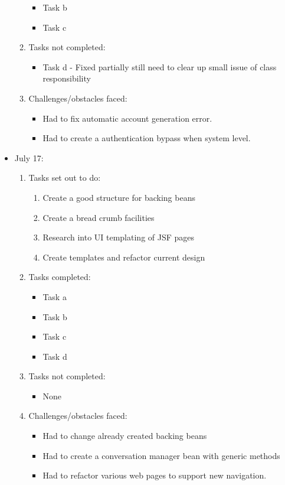 \begin{itemize}
\begin{enumerate}
\begin{itemize}
			\item Task b
			\item Task c								
		\end{itemize}
		\item Tasks not completed:
		\begin{itemize}
			\item Task d - Fixed partially still need to clear up small issue of class responsibility
		\end{itemize}
		\item Challenges/obstacles faced:
		\begin{itemize}
			\item Had to fix automatic account generation error.
			\item Had to create a authentication bypass when system level.
		\end{itemize}			
	\end{enumerate}
	\item July 17:
	\begin{enumerate}
		\item Tasks set out to do:
		\begin{enumerate}
			\item Create a good structure for backing beans
			\item Create a bread crumb facilities
			\item Research into UI templating of JSF pages
			\item Create templates and refactor current design			
		\end{enumerate}
		\item Tasks completed:
		\begin{itemize}
			\item Task a
			\item Task b
			\item Task c
			\item Task d								
		\end{itemize}
		\item Tasks not completed:
		\begin{itemize}
			\item None
		\end{itemize}
		\item Challenges/obstacles faced:
		\begin{itemize}
			\item Had to change already created backing beans
			\item Had to create a conversation manager bean with generic methods
			\item Had to refactor various web pages to support new navigation.

\end{itemize}
\end{enumerate}
\end{itemize}
